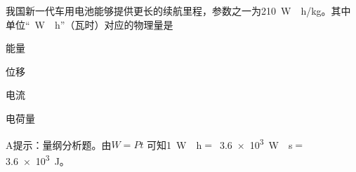 我国新一代车用电池能够提供更长的续航里程，参数之一为\qty{210}{W\cdot h/kg}。其中单位“\qty{}{W\cdot h}”（瓦时）对应的物理量是\paren[]
\begin{choices}
	\item 能量
	\item 位移
	\item 电流
	\item 电荷量
\end{choices}
\begin{answer}
	A\qquad 提示：量纲分析题。由\(W = Pt\) 可知\qty{1}{W\cdot h}\( =\) \,\qty{3.6e3}{W\cdot s}\( =\) \,\qty{3.6e3}{J}。
\end{answer}